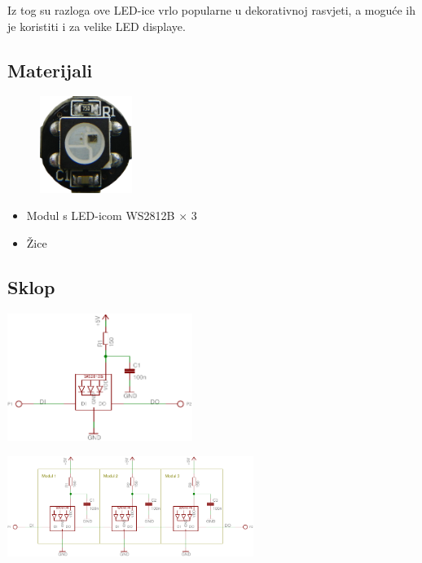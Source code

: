 \documentclass[times, utf8, zavrsni, numeric, sort]{fer}
\begin{document}
Iz tog su razloga ove LED-ice vrlo popularne u dekorativnoj rasvjeti, a moguće ih je koristiti i za velike LED displaye.

\subsection{Materijali}

\begin{figure}[h!]
	\centering
	\includegraphics[width=3cm]{./Fotke/WS2812B/Materijal.jpg}
	\label{fig:slika1}
\end{figure}

\begin{itemize}
	\setlength{\itemsep}{0pt}
	\setlength{\parskip}{0pt}
	
	\item Modul s LED-icom WS2812B $\times$ 3
	\item Žice
\end{itemize}

\subsection{Sklop}

\begin{minipage}{1.0\textwidth}
	\centering
	\includegraphics[width=6cm]{./Sklopovi/WS2812B/WS2812B-module.pdf}

	\label{fig:ws2812b-module}
\end{minipage}

\begin{minipage}{1.0\textwidth}
	\centering
	\includegraphics[width=8cm]{./Sklopovi/WS2812B/WS2812B-strip.pdf}
	\label{fig:ws2812b-strip}
\end{minipage}
\end{document}
